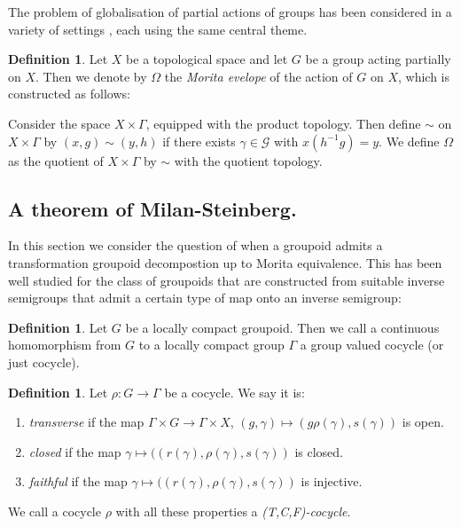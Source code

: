 \documentclass[11pt]{amsart}
\theoremstyle{plain}
\theoremstyle{definition}%
\newtheorem{definition}[theorem]{Definition}%
\theoremstyle{remark}%
\newcommand{\G}{\mathcal{G}}
\begin{document}
The problem of globalisation of partial actions of groups has been considered in a variety of settings \cite{MR0160848, MR1798993, MR2041539, MR2419858, MR1900993, Milan-Steinberg}, each using the same central theme.

\begin{definition}
Let $X$ be a topological space and let $G$ be a group acting partially on $X$. Then we denote by $\Omega$ the \textit{Morita evelope} of the action of $G$ on $X$, which is constructed as follows:

Consider the space $X\times \Gamma$, equipped with the product topology. Then define $\sim$ on $X\times \Gamma$ by $(x,g)\sim (y,h)$ if there exists $\gamma \in \G$ with $x(h^{-1}g)=y$. We define $\Omega$ as the quotient of $X\times \Gamma$ by $\sim$ with the quotient topology. 
\end{definition}

\subsection{A theorem of Milan-Steinberg.}

In this section we consider the question of when a groupoid admits a transformation groupoid decompostion up to Morita equivalence. This has been well studied for the class of groupoids that are constructed from suitable inverse semigroups \cite{MR1900993,Milan-Steinberg} that admit a certain type of map onto an inverse semigroup:

\begin{definition}
Let $G$ be a locally compact groupoid. Then we call a continuous homomorphism from $G$ to a locally compact group $\Gamma$ a group valued cocycle (or just cocycle).
\end{definition}

\begin{definition}
Let $\rho: G \rightarrow \Gamma$ be a cocycle. We say it is:
\begin{enumerate}
\item \textit{transverse} if the map $\Gamma \times G \rightarrow \Gamma \times X$, $(g, \gamma) \mapsto (g\rho(\gamma),s(\gamma))$ is open.
\item \textit{closed} if the map $\gamma \mapsto ((r(\gamma),\rho(\gamma),s(\gamma))$ is closed.
\item \textit{faithful} if the map $\gamma \mapsto ((r(\gamma),\rho(\gamma),s(\gamma))$ is injective.
\end{enumerate}
We call a cocycle $\rho$ with all these properties a \textit{(T,C,F)-cocycle}.
\end{definition}
\end{document}
